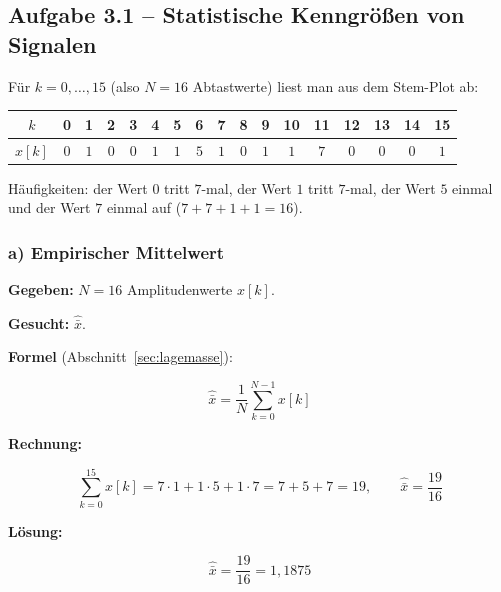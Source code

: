 \subsection*{Aufgabe 3.1 – Statistische Kenngrößen von Signalen}

Für $k = 0, \ldots, 15$ (also $N = 16$ Abtastwerte) liest man aus dem Stem-Plot ab:

\begin{center}
\renewcommand{\arraystretch}{1.2}
\begin{tabular}{c|cccccccccccccccc}
$k$    & 0 & 1 & 2 & 3 & 4 & 5 & 6 & 7 & 8 & 9 & 10 & 11 & 12 & 13 & 14 & 15 \\
\hline
$x[k]$ & $0$ & $1$ & $0$ & $0$ & $1$ & $1$ & $5$ & $1$ & $0$ & $1$
       & $1$ & $7$ & $0$ & $0$ & $0$ & $1$ \\
\end{tabular}
\end{center}

\begin{center}
\end{center}

Häufigkeiten: der Wert $0$ tritt $7$-mal, der Wert $1$ tritt $7$-mal, der Wert $5$
einmal und der Wert $7$ einmal auf ($7+7+1+1 = 16$).

\subsubsection*{a) Empirischer Mittelwert}

\begin{beispiel}

\textbf{Gegeben:} $N = 16$ Amplitudenwerte $x[k]$.

\textbf{Gesucht:} $\hat{\bar{x}}$.

\textbf{Formel} (Abschnitt~\ref{sec:lagemasse}):

$$
\hat{\bar{x}} = \frac{1}{N} \sum_{k=0}^{N-1} x[k]
$$

\textbf{Rechnung:}

$$
\sum_{k=0}^{15} x[k] = 7\cdot 1 + 1\cdot 5 + 1\cdot 7 = 7 + 5 + 7 = 19,
\qquad
\hat{\bar{x}} = \frac{19}{16}
$$

\textbf{Lösung:}

$$
\boxed{\;\hat{\bar{x}} = \frac{19}{16} = 1{,}1875\;}
$$

\end{beispiel}

